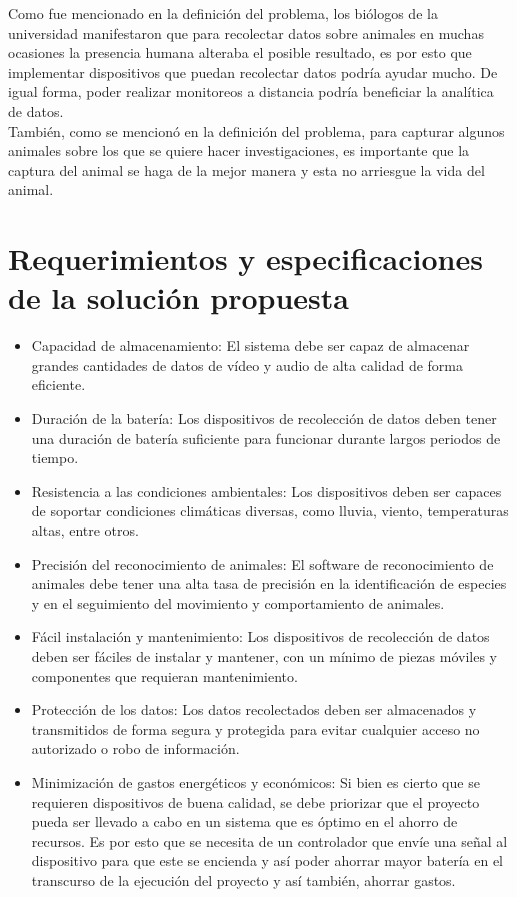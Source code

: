 Como fue mencionado en la definición del problema, los biólogos de la universidad manifestaron que para recolectar datos sobre animales en muchas ocasiones la presencia humana alteraba el posible resultado, es por esto que implementar dispositivos que puedan recolectar datos podría ayudar mucho. De igual forma, poder realizar monitoreos a distancia podría beneficiar la analítica de datos. \\
También, como se mencionó en la definición del problema, para capturar algunos animales sobre los que se quiere hacer investigaciones, es importante que la captura del animal se haga de la mejor manera y esta no arriesgue la vida del animal.
\section{Requerimientos y especificaciones de la solución propuesta}

\begin{itemize}
    \item Capacidad de almacenamiento: El sistema debe ser capaz de almacenar grandes cantidades de datos de vídeo y audio de alta calidad de forma eficiente.
    \item Duración de la batería: Los dispositivos de recolección de datos deben tener una duración de batería suficiente para funcionar durante largos periodos de tiempo.
    \item Resistencia a las condiciones ambientales: Los dispositivos deben ser capaces de soportar condiciones climáticas diversas, como lluvia, viento, temperaturas altas, entre otros.
    \item Precisión del reconocimiento de animales: El software de reconocimiento de animales debe tener una alta tasa de precisión en la identificación de especies y en el seguimiento del movimiento y comportamiento de animales.
    \item Fácil instalación y mantenimiento: Los dispositivos de recolección de datos deben ser fáciles de instalar y mantener, con un mínimo de piezas móviles y componentes que requieran mantenimiento.
    \item Protección de los datos: Los datos recolectados deben ser almacenados y transmitidos de forma segura y protegida para evitar cualquier acceso no autorizado o robo de información.
    \item Minimización de gastos energéticos y económicos: Si bien es cierto que se requieren dispositivos de buena calidad, se debe priorizar que el proyecto pueda ser llevado a cabo en un sistema que es óptimo en el ahorro de recursos. Es por esto que se necesita de un controlador que envíe una señal al dispositivo para que este se encienda y así poder ahorrar mayor batería en el transcurso de la ejecución del proyecto y así también, ahorrar gastos.
\end{itemize}
